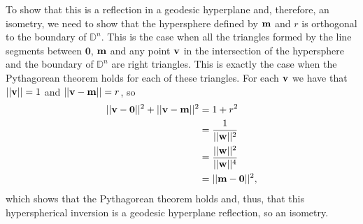 To show that this is a reflection in a geodesic hyperplane and, therefore, an isometry, we need to show that the hypersphere defined by $\mathbf{m}$ and $r$ is orthogonal to the boundary of $\mathbb{D}^n$. This is the case when all the triangles formed by the line segments between $\mathbf{0}$, $\mathbf{m}$ and any point $\mathbf{v}$ in the intersection of the hypersphere and the boundary of $\mathbb{D}^n$ are right triangles. This is exactly the case when the Pythagorean theorem holds for each of these triangles. For each $\mathbf{v}$ we have that $||\mathbf{v}|| = 1$ and $||\mathbf{v} - \mathbf{m}|| = r$, so
\begin{align}
    ||\mathbf{v} - \mathbf{0}||^2 + ||\mathbf{v} - \mathbf{m}||^2 &= 1 + r^2 \\
    &= \frac{1}{||\mathbf{w}||^2} \\
    &= \frac{||\mathbf{w}||^2}{||\mathbf{w}||^4} \\
    &= ||\mathbf{m} - \mathbf{0}||^2,
\end{align}
which shows that the Pythagorean theorem holds and, thus, that this hyperspherical inversion is a geodesic hyperplane reflection, so an isometry.

